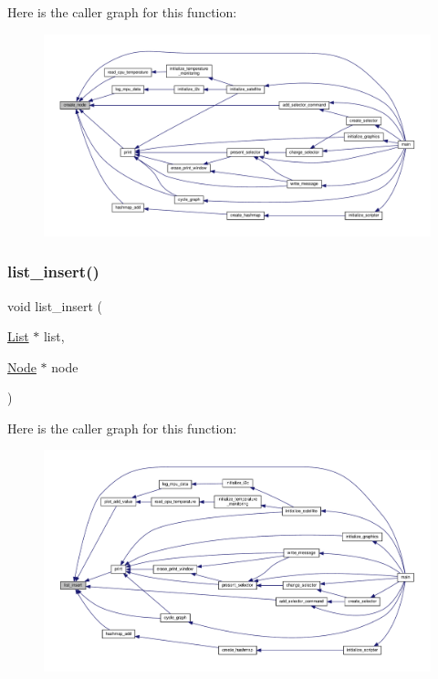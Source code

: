 Here is the caller graph for this function\+:
\nopagebreak
\begin{figure}[H]
\begin{center}
\leavevmode
\includegraphics[width=350pt]{linked-list_8h_a45dfa9366701eddf667fd95d05cc3be0_icgraph}
\end{center}
\end{figure}
\mbox{\label{linked-list_8h_a947069a28d8173531d9186a74e82fb62}} 
\subsubsection{\texorpdfstring{list\+\_\+insert()}{list\_insert()}}
{\footnotesize\ttfamily void list\+\_\+insert (\begin{DoxyParamCaption}\item[{\hyperlink{structList}{List} $\ast$}]{list,  }\item[{\hyperlink{structNode}{Node} $\ast$}]{node }\end{DoxyParamCaption})}

Here is the caller graph for this function\+:
\nopagebreak
\begin{figure}[H]
\begin{center}
\leavevmode
\includegraphics[width=350pt]{linked-list_8h_a947069a28d8173531d9186a74e82fb62_icgraph}
\end{center}
\end{figure}
\mbox{\label{linked-list_8h_ad17dd6e2d3e64d3e9665f313ffb808a1}} 
